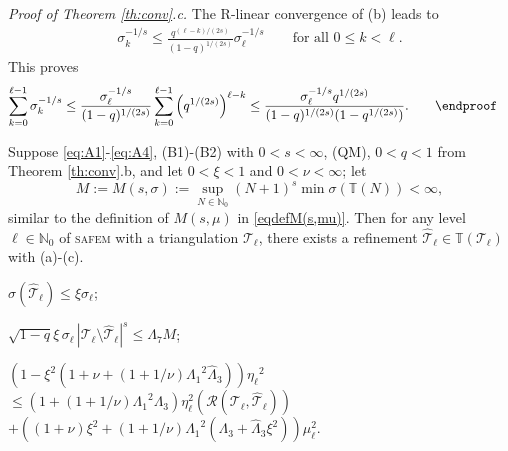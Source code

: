 \documentclass{siamltex1213}
\begin{document}
 \noindent\textit{Proof of Theorem \ref{th:conv}.c.} The R-linear convergence of (b) leads to
  	\begin{align*}
		\sigma_k^{-1/s} \leq \frac{q^{(\ell-k)/(2s)}}{(1-q)^{1/(2s)}}  \sigma_\ell^{-1/s}\qquad \text{for all } 0\leq k <\ell.
	\end{align*}
 	This proves 
	\begin{align*}
		\sum_{k=0}^{\ell-1} \sigma_k^{-1/s} &\leq \frac{\sigma_\ell^{-1/s}}{(1-q)^{1/(2s)}} \sum_{k=0}^{\ell-1}\left(q^{1/(2s)}\right)^{\ell-k} \leq \frac{\sigma_\ell^{-1/s} q^{1/(2s)}}{(1-q)^{1/(2s)}(1-q^{1/(2s)})}.\qquad \endproof
	\end{align*}
	
\begin{lemma}[Comparison]\label{lem:competition} 
Suppose \eqref{eq:A1}-\eqref{eq:A4}, (B1)-(B2) with $0<s<\infty$, (QM),
		$0<q<1$ from Theorem \ref{th:conv}.b, and let $0<\xi<1$ and $0<\nu<\infty$; let 
		\begin{equation} \label{eqdefM(s,sigma)}
			M:=M(s,\sigma):= \sup_{N\in {\mathbb{N}_0}}(N+1)^s \min \sigma({\mathbb T\left({N}\right)})<\infty,
		\end{equation}
		similar to the definition of $M(s,\mu)$ in \eqref{eqdefM(s,mu)}.
 		Then for any level $\ell \in {\mathbb{N}_0}$ of {\textsc{safem}\xspace} with a triangulation ${\mathcal T_{\ell}}$,  
	there exists a refinement ${\hat{\mathcal{T}}_{\ell}} \in {\mathbb T\left({{\mathcal T_{\ell}}}\right)}$ with (a)-(c).
	\begin{alphenum}
		\item $\displaystyle \sigma ({\hat{\mathcal{T}}_{\ell}}) \leq \xi \sigma_\ell$;
		\item $\displaystyle\sqrt{1-q}\xi \, \sigma_\ell \,  
		{\left\lvert {{\mathcal T_{\ell}} \setminus {\hat{\mathcal{T}}_{\ell}}} \right\rvert}^s \leq {\ensuremath{\Lambda_{\mathrm{7}}}} M$;
		\item 
			$ \left( 1 -\xi^2(1+\nu+ (1+1/\nu){\ensuremath{\Lambda_{\mathrm{1}}}}^2{\ensuremath{\widehat{\Lambda}_{\mathrm{3}}}})\right){\eta_{{\ell}}}^2$  \\
			\phantom{xx} $\leq  
			\left(1+( 1+1/\nu){\ensuremath{\Lambda_{\mathrm{1}}}}^2{\ensuremath{\Lambda_{\mathrm{3}}}}\right) \eta^2_\ell(\mathcal R({\mathcal T_{\ell}}, {\hat{\mathcal{T}}_{\ell}}))$
			\\
			\phantom{xxxx} $+ \left((1+\nu)\xi^2 + (1+1/\nu){\ensuremath{\Lambda_{\mathrm{1}}}}^2({\ensuremath{\Lambda_{\mathrm{3}}}}+{\ensuremath{\widehat{\Lambda}_{\mathrm{3}}}}\xi^2) \right)\mu^2_\ell .$

	\end{alphenum}
\end{lemma}
\end{document}
